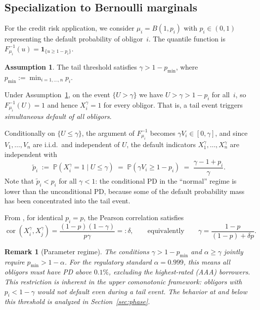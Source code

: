 \documentclass[11pt]{article}
\newtheorem{remark}[theorem]{Remark}
\theoremstyle{definition}
\newtheorem{assumption}{Assumption}
\newcommand{\PP}{\mathbb{P}}
\newcommand{\1}{\mathbf{1}}
\begin{document}
\subsection{Specialization to Bernoulli marginals}\label{sec:bernoulli_setup}

For the credit risk application, we consider $\mu_i = B(1, p_i)$ with $p_i \in (0,1)$ representing the default probability of obligor~$i$. The quantile function is $F_{\mu_i}^{-1}(u) = \1_{\{u \geq 1 - p_i\}}$.

\begin{assumption}\label{ass:gamma}
The tail threshold satisfies $\gamma > 1 - p_{\min}$, where $p_{\min} := \min_{i=1,\ldots,n} p_i$.
\end{assumption}

Under Assumption~\ref{ass:gamma}, on the event $\{U > \gamma\}$ we have $U > \gamma > 1 - p_i$ for all~$i$, so $F_{\mu_i}^{-1}(U) = 1$ and hence $X_i^\gamma = 1$ for every obligor. That is, a tail event triggers \emph{simultaneous default of all obligors}.

Conditionally on $\{U \leq \gamma\}$, the argument of $F_{\mu_i}^{-1}$ becomes $\gamma V_i \in [0, \gamma]$, and since $V_1, \ldots, V_n$ are i.i.d.\ and independent of $U$, the default indicators $X_1^\gamma, \ldots, X_n^\gamma$ are independent with
\begin{equation}\label{eq:cond_pd}
  \tilde{p}_i \;:=\; \PP(X_i^\gamma = 1 \mid U \leq \gamma) \;=\; \PP(\gamma V_i \geq 1 - p_i) \;=\; \frac{\gamma - 1 + p_i}{\gamma}.
\end{equation}
Note that $\tilde{p}_i < p_i$ for all $\gamma < 1$: the conditional PD in the ``normal'' regime is lower than the unconditional PD, because some of the default probability mass has been concentrated into the tail event.

From \citet[Example~12a(i)]{DVNSupper}, for identical $p_i = p$, the Pearson correlation satisfies
\begin{equation}\label{eq:cor_gamma}
  \operatorname{cor}(X_i^\gamma, X_j^\gamma) = \frac{(1-p)(1-\gamma)}{p\gamma} =: \delta,
  \qquad\text{equivalently}\qquad
  \gamma = \frac{1-p}{(1-p) + \delta p}.
\end{equation}

\begin{remark}[Parameter regime]\label{rem:regime}
The conditions $\gamma > 1 - p_{\min}$ and $\alpha \geq \gamma$ jointly require $p_{\min} > 1 - \alpha$. For the regulatory standard $\alpha = 0.999$, this means all obligors must have PD above $0.1\%$, excluding the highest-rated (AAA) borrowers. This restriction is inherent in the upper comonotonic framework: obligors with $p_i < 1 - \gamma$ would not default even during a tail event. The behavior at and below this threshold is analyzed in Section~\ref{sec:phase}.
\end{remark}
\end{document}
